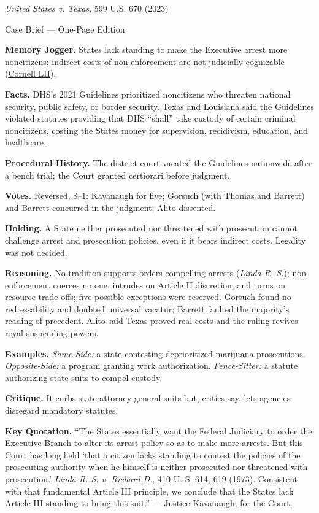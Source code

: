\documentclass[12pt]{article}
\begin{document}
\begin{center}
{\Large \textit{United States v. Texas}, 599 U.S. 670 (2023)\par}
\vspace{0.3em}
{\normalsize Case Brief --- One-Page Edition\par}
\end{center}

\textbf{Memory Jogger.} States lack standing to make the Executive arrest more noncitizens; indirect costs of non-enforcement are not judicially cognizable (\href{https://www.law.cornell.edu/supremecourt/text/22-58}{Cornell LII}).

\textbf{Facts.} DHS's 2021 Guidelines prioritized noncitizens who threaten national security, public safety, or border security. Texas and Louisiana said the Guidelines violated statutes providing that DHS ``shall'' take custody of certain criminal noncitizens, costing the States money for supervision, recidivism, education, and healthcare.

\textbf{Procedural History.} The district court vacated the Guidelines nationwide after a bench trial; the Court granted certiorari before judgment.

\textbf{Votes.} Reversed, 8--1: Kavanaugh for five; Gorsuch (with Thomas and Barrett) and Barrett concurred in the judgment; Alito dissented.

\textbf{Holding.} A State neither prosecuted nor threatened with prosecution cannot challenge arrest and prosecution policies, even if it bears indirect costs. Legality was not decided.

\textbf{Reasoning.} No tradition supports orders compelling arrests (\textit{Linda R. S.}); non-enforcement coerces no one, intrudes on Article II discretion, and turns on resource trade-offs; five possible exceptions were reserved. Gorsuch found no redressability and doubted universal vacatur; Barrett faulted the majority's reading of precedent. Alito said Texas proved real costs and the ruling revives royal suspending powers.

\textbf{Examples.} \emph{Same-Side:} a state contesting deprioritized marijuana prosecutions. \emph{Opposite-Side:} a program granting work authorization. \emph{Fence-Sitter:} a statute authorizing state suits to compel custody.

\textbf{Critique.} It curbs state attorney-general suits but, critics say, lets agencies disregard mandatory statutes.

\textbf{Key Quotation.} ``The States essentially want the Federal Judiciary to order the Executive Branch to alter its arrest policy so as to make more arrests. But this Court has long held `that a citizen lacks standing to contest the policies of the prosecuting authority when he himself is neither prosecuted nor threatened with prosecution.' \textit{Linda R. S. v. Richard D.}, 410 U. S. 614, 619 (1973). Consistent with that fundamental Article III principle, we conclude that the States lack Article III standing to bring this suit.'' --- Justice Kavanaugh, for the Court.
\end{document}
